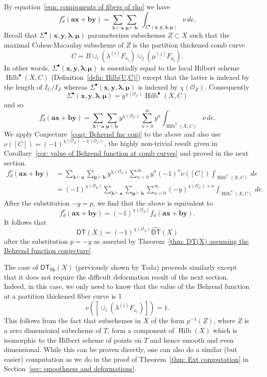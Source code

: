 \documentclass[12pt]{amsart}
\theoremstyle{definition}
\renewcommand{\O}{\mathcal{O}}
\newcommand{\Hilb}{\operatorname{Hilb}}
\newcommand{\DT}{\mathsf{DT}}
\newcommand{\boldx}{\boldsymbol{x}}
\newcommand{\boldy}{\boldsymbol{y}}
\newcommand{\bolda}{\boldsymbol{a}}
\newcommand{\boldb}{\boldsymbol{b}}
\newcommand{\boldlambda}{\boldsymbol{\lambda }}
\newcommand{\boldmu}{\boldsymbol{\mu }}
\newcommand{\Sigmaxylambdamu}{\Sigma^{\bullet }(\boldx ,\boldy ,\boldlambda ,\boldmu )}
\newcommand{\DThat}{\widehat{\DT}}
\newcommand{\fiber}{\mathsf{fib}}
\begin{document}
By equation~\eqref{eqn: components of fibers of rho} we have
\[
f_{d}^{\nu}(\bolda \boldx +\boldb \boldy ) = \sum_{\boldlambda \vdash
\bolda} \sum_{\boldmu \vdash \boldb} \,\, \int_{\Sigmaxylambdamu} \nu \, de.
\]
Recall that $\Sigmaxylambdamu$ parameterizes subschemes $Z\subset X$
such that the maximal Cohen-Macaulay subscheme of $Z$ is the partition
thickened comb curve
\[
C=B \cup_{i}\left(\lambda^{(i)}F_{x_{i}} \right) \cup_{j}\left(\mu^{(j)}F_{y_{j}} \right).
\]
In other words, $\Sigmaxylambdamu$ is essentially equal to the local
Hilbert scheme $\Hilb^{\bullet}(X,C)$ (Definition~\ref{defn:
Hilb(U,C)}) except that the latter is indexed by the length of
$I_{C}/I_{Z}$ whereas $\Sigmaxylambdamu$ is indexed by $\chi
(\O_{Z})$. Consequently
\[
\Sigmaxylambdamu  = y^{\chi (\O_{C})} \Hilb^{\bullet}(X,C)
\]
and so 
\[
f_{d}^{\nu}(\bolda \boldx +\boldb \boldy ) = \sum_{\boldlambda \vdash
\bolda} \sum_{\boldmu \vdash \boldb} y^{\chi
(\O_{C})}\sum_{n=0}^{\infty}y^{n} \int_{\Hilb^{n}(X,C)} \nu \, de.
\]
We apply Conjecture~\ref{conj: Behrend fnc conj} to the above and also
use $\nu ([C]) = (-1)^{\chi (\O_{S})-\chi (\O_{C})}$, the highly
non-trivial result given in Corollary~\ref{cor: value of Behrend
function at comb curves} and proved in the next section. 
\begin{align*}
f_{d}^{\nu}(\bolda \boldx +\boldb \boldy )& = \sum_{\boldlambda \vdash
\bolda} \sum_{\boldmu \vdash \boldb} y^{\chi
(\O_{C})}\sum_{n=0}^{\infty} y^{n}(-1)^{n}\nu ([C]) \int_{\Hilb^{n}(X,C)}  \, de\\
&=(-1)^{\chi (\O_{S})} \sum_{\boldlambda \vdash \bolda} \sum_{\boldmu
\vdash \boldb} \sum_{n=0}^{\infty} (-y)^{\chi (\O_{C})+n}
\int_{\Hilb^{n}(X,C)} \, de.
\end{align*}
After the substitution $-y=p$, we find that the above is equivalent to 
\[
f^{\nu}_{d}(\bolda \boldx +\boldb \boldy ) = (-1)^{\chi (\O_{S})}
f_{d}(\bolda \boldx +\boldb \boldy ).
\]
It follows that 
\[
\DT (X) = (-1)^{\chi (\O_{S})} \DThat (X)
\]
after the substitution $p=-y$ as asserted by Theorem~\ref{thm: DT(X)
assuming the Behrend function conjecture}.

The case of $\DT_{\fiber}(X)$ (previously shown by Toda) proceeds
similarly except that it does not require the difficult deformation
result of the next section. Indeed, in this case, we only need to know
that the value of the Behrend function at a partition thickened fiber
curve is 1
\[
\nu \left(\left[ \cup_{i} \left(\lambda^{(i)}F_{x_{i}} \right) \right]
\right) =1.
\]
This follows from the fact that subschemes in $X$ of the form
$p^{-1}(Z)$, where $Z$ is a zero dimensional subscheme of $T$, form a
component of $\Hilb (X)$ which is isomorphic to the Hilbert scheme of
points on $T$ and hence smooth and even dimensional. While this can be
proven directly, one can also do a similar (but easier) computation as
we do in the proof of Theorem~\ref{thm: Ext computation} in
Section~\ref{sec: smoothness and deformations}.
\end{document}
